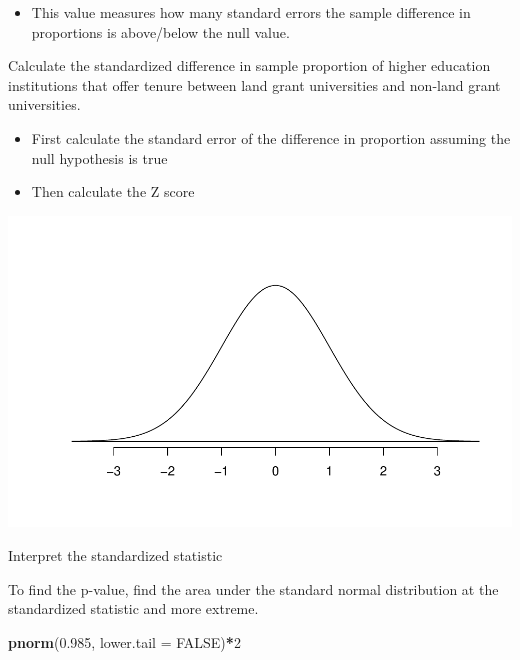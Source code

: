 \documentclass[
]{report}
\newenvironment{Shaded}{\begin{snugshade}}{\end{snugshade}}
\newcommand{\AttributeTok}[1]{\textcolor[rgb]{0.13,0.29,0.53}{#1}}
\newcommand{\ConstantTok}[1]{\textcolor[rgb]{0.56,0.35,0.01}{#1}}
\newcommand{\DecValTok}[1]{\textcolor[rgb]{0.00,0.00,0.81}{#1}}
\newcommand{\FloatTok}[1]{\textcolor[rgb]{0.00,0.00,0.81}{#1}}
\newcommand{\FunctionTok}[1]{\textcolor[rgb]{0.13,0.29,0.53}{\textbf{#1}}}
\newcommand{\NormalTok}[1]{#1}
\newcommand{\SpecialCharTok}[1]{\textcolor[rgb]{0.81,0.36,0.00}{\textbf{#1}}}
\providecommand{\tightlist}{%
  \setlength{\itemsep}{0pt}\setlength{\parskip}{0pt}}
\begin{document}

\begin{itemize}
\tightlist
\item
  This value measures how many standard errors the sample difference in proportions is above/below the null value.
\end{itemize}


Calculate the standardized difference in sample proportion of higher education institutions that offer tenure between land grant universities and non-land grant universities.

\begin{itemize}
\tightlist
\item
  First calculate the standard error of the difference in proportion assuming the null hypothesis is true
\end{itemize}

\vspace{0.4in}

\begin{itemize}
\tightlist
\item
  Then calculate the Z score
\end{itemize}

\vspace{0.4in}

\begin{center}\includegraphics[width=0.5\linewidth]{09-VN09-two-cat-theory_files/figure-latex/standNormc-1} \end{center}

Interpret the standardized statistic

\vspace{0.5in}

\newpage

To find the p-value, find the area under the standard normal distribution at the standardized statistic and more extreme.

\begin{Shaded}
\begin{Highlighting}[]
\FunctionTok{pnorm}\NormalTok{(}\FloatTok{0.985}\NormalTok{, }\AttributeTok{lower.tail =} \ConstantTok{FALSE}\NormalTok{)}\SpecialCharTok{*}\DecValTok{2}
\end{Highlighting}
\end{Shaded}
\end{document}
